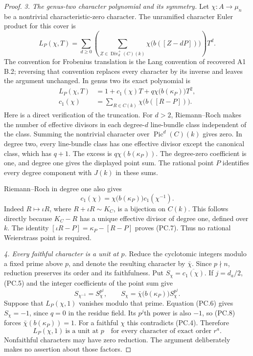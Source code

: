 \documentclass[11pt,a4paper]{article}
\begin{document}
\begin{proof}
\emph{3. The genus-two character polynomial and its symmetry.}
Let $\chi:A\to\mu_n$ be a nontrivial characteristic-zero
character. The unramified character Euler product for this cover is
\[
 L_P(\chi,T)
 =\sum_{d\ge0}\left(
   \sum_{Z\in\operatorname{Div}^{+}_d(C)(k)}
      \chi\bigl(b([Z-dP])\bigr)\right)T^d.
\]
The convention for Frobenius translation is the Lang convention
of recovered A1 B.2; reversing that convention replaces every
character by its inverse and leaves the argument unchanged.
In genus two its exact polynomial is
\[
 \begin{aligned}
 L_P(\chi,T)&=1+c_1(\chi)T
                  +q\chi\bigl(b(\kappa_P)\bigr)T^2,\\
 c_1(\chi)&=\sum_{R\in C(k)}\chi\bigl(b([R-P])\bigr).
 \end{aligned}
 \tag{PC.6}
\]
Here is a direct verification of the truncation. For $d>2$,
Riemann--Roch makes the number of effective divisors in each
degree-$d$ line-bundle class independent of the class. Summing
the nontrivial character over $\operatorname{Pic}^d(C)(k)$ gives
zero. In degree two, every line-bundle class has one effective
divisor except the canonical class, which has $q+1$. The excess
is $q\chi(b(\kappa_P))$. The degree-zero coefficient is one,
and degree one gives the displayed point sum. The rational point
$P$ identifies every degree component with $J(k)$ in these sums.

Riemann--Roch in degree one also gives
\[
 c_1(\chi)=\chi\bigl(b(\kappa_P)\bigr)c_1(\chi^{-1}).
 \tag{PC.7}
\]
Indeed $R\mapsto\iota R$, where $R+\iota R\sim K_C$, is a
bijection on $C(k)$. This follows directly because $K_C-R$ has
a unique effective divisor of degree one, defined over $k$.
The identity
$[\iota R-P]=\kappa_P-[R-P]$ proves (PC.7).
Thus no rational Weierstrass point is required.

\emph{4. Every faithful character is a unit at $p$.}
Reduce the cyclotomic integers modulo a fixed prime above $p$,
and denote the resulting character by $\bar\chi$. Since
$p\nmid n$, reduction preserves its order and its faithfulness.
Put $S_\chi=\overline{c_1(\chi)}$. If $j=d_a/2$, (PC.5)
and the integer coefficients of the point sum give
\[
 S_{\chi^{-1}}=S_\chi^{p^j},\qquad
 S_\chi=\bar\chi\bigl(b(\kappa_P)\bigr)S_\chi^{p^j}.
 \tag{PC.8}
\]
Suppose that $L_P(\chi,1)$ vanishes modulo that prime.
Equation (PC.6) gives $S_\chi=-1$, since $q=0$ in the residue
field. Its $p^j$th power is also $-1$, so (PC.8) forces
$\bar\chi(b(\kappa_P))=1$.
For a faithful $\chi$ this contradicts (PC.4). Therefore
\[
 L_P(\chi,1)\ \text{is a unit at }p
       \quad\text{for every character of exact order }r^a.
 \tag{PC.9}
\]
Nonfaithful characters may have zero reduction. The argument
deliberately makes no assertion about those factors.


\end{proof}
\end{document}
